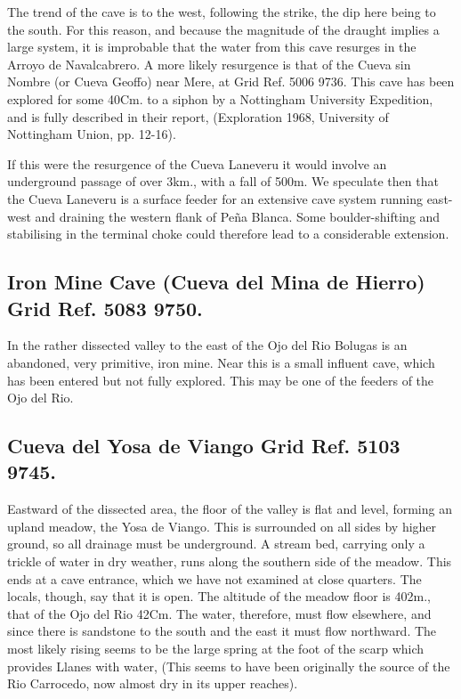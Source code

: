 \documentclass[11pt, a4paper, twoside]{memoir}
\begin{document}
The trend of the cave is to the west, following the strike, the dip here being to the south. For this reason, and because the magnitude of the draught implies a large system, it is improbable that the water from this cave resurges in the Arroyo de Navalcabrero. A more likely resurgence is that of the Cueva sin Nombre (or Cueva Geoffo) near Mere, at Grid Ref. 5006 9736. This cave has been explored for some 40Cm. to a siphon by a Nottingham University Expedition, and is fully described in their report, (Exploration 1968, University of Nottingham Union, pp. 12-16).

If this were the resurgence of the Cueva Laneveru it would involve an underground passage of over 3km., with a fall of 500m. We speculate then that the Cueva Laneveru is a surface feeder for an extensive cave system running east-west and draining the western flank of Peña Blanca. Some boulder-shifting and stabilising in the terminal choke could therefore lead to a considerable extension.




\subsection*{Iron Mine Cave (Cueva del Mina de Hierro) Grid Ref. 5083 9750.}


In the rather dissected valley to the east of the Ojo del Rio Bolugas is an abandoned, very primitive, iron mine. Near this is a small influent cave, which has been entered but not fully explored. This may be one of the feeders of the Ojo del Rio.

\subsection*{Cueva del Yosa de Viango Grid Ref. 5103 9745.}


Eastward of the dissected area, the floor of the valley is flat and level, forming an upland meadow, the Yosa de Viango. This is surrounded on all sides by higher ground, so all drainage must be underground. A stream bed, carrying only a trickle of water in dry weather, runs along the southern side of the meadow. This ends at a cave entrance, which we have not examined at close quarters. The locals, though, say that it is open. The altitude of the meadow floor is 402m., that of the Ojo del Rio 42Cm. The water, therefore, must flow elsewhere, and since there is sandstone to the south and the east it must flow northward. The most likely rising seems to be the large spring at the foot of the scarp which provides Llanes with water, (This seems to have been originally the source of the Rio Carrocedo, now almost dry in its upper reaches).
\end{document}
